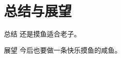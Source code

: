 
\section{总结与展望}
\label{sec:conclusion}

\begin{comment}
最后一定要有总结，突出个人工作和结果
展望和工作的不足之处不宜多，淡化处理。
致谢可以写，但要简练，并且不要照着读，一句话即可，如：“最后，感谢所有关心和帮助过我的每一个人，感谢各位专家和评委老师”。
\end{comment}

\begin{frame}{总结}
还是摸鱼适合老子。
\end{frame}

\begin{frame}{展望}
今后也要做一条快乐摸鱼的咸鱼。
\end{frame}

